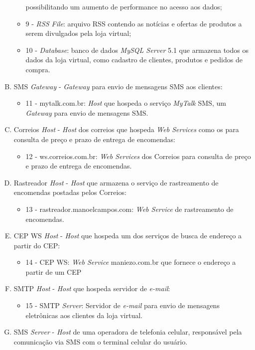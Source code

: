 \begin{enumerate}[A)]
\begin{itemize}
		possibilitando um aumento de performance no acesso aos dados;
		\item 9 - \textit{RSS File}: arquivo RSS contendo as notícias e ofertas de produtos a serem divulgados pela loja virtual;
		\item 10 - \textit{Database}: banco de dados \textit{MySQL Server} 5.1 que armazena todos os dados da loja virtual, como cadastro
		de clientes, produtos e pedidos de compra.
	\end{itemize}
	\item SMS \textit{Gateway} - \textit{Gateway} para envio de mensagens SMS aos clientes:
	\begin{itemize}
		\item 11 - mytalk.com.br: \textit{Host} que hospeda o serviço \textit{MyTalk} SMS, um \textit{Gateway} para envio de mensagens SMS.
	\end{itemize}
	\item Correios \textit{Host} - \textit{Host} dos correios que hospeda \textit{Web Services} como os para consulta de preço e prazo de entrega de encomendas:
	\begin{itemize}
		\item 12 - ws.correios.com.br: \textit{Web Services} dos Correios para consulta de preço e prazo de entrega de encomendas.
	\end{itemize}
	\item Rastreador \textit{Host} - \textit{Host} que armazena o serviço de rastreamento de encomendas postadas pelos Correios:
	\begin{itemize}
		\item 13 - rastreador.manoelcampos.com: \textit{Web Service} de rastreamento de encomendas.
	\end{itemize}
	\item CEP WS \textit{Host} - \textit{Host} que hospeda um dos serviços de busca de endereço a partir do CEP:
	\begin{itemize}
		\item 14 - CEP WS: \textit{Web Service} maniezo.com.br que fornece o endereço a partir de um CEP
	\end{itemize}
	\item SMTP \textit{Host} - \textit{Host} que hospeda servidor de \textit{e-mail}:
	\begin{itemize}
		\item 15 - SMTP \textit{Server}: Servidor de \textit{e-mail} para envio de mensagens eletrônicas aos clientes da loja virtual.
	\end{itemize}
	\item SMS \textit{Server} - \textit{Host} de uma operadora de telefonia celular, responsável pela comunicação via SMS com o terminal celular do usuário.
\end{enumerate}


